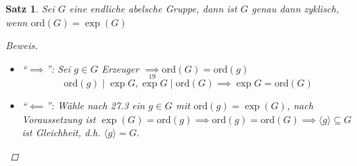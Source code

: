 \documentclass[a4paper]{article}
\theoremstyle{plain}
\newtheorem{satz}[thm]{Satz}
\theoremstyle{definition}
\begin{document}
\begin{satz}
Sei $G$ eine endliche abelsche Gruppe, dann ist $G$ genau dann zyklisch, wenn $\mathrm{ord}(G) = \exp(G)$
\begin{proof}[Beweis] \item
\begin{itemize}
\item ``$\implies$'': Sei $g \in G$ Erzeuger $\underset{19}\implies \mathrm{ord}(G) = \mathrm{ord}(g)$
$$\mathrm{ord}(g) \mid \exp G, \exp G \mid \mathrm{ord}(G) \implies \exp G = \mathrm{ord}(G)$$
\item ``$\impliedby$'': Wähle nach 27.3 ein $g \in G$ mit $\mathrm{ord}(g) = \exp(G)$, nach Voraussetzung ist $\exp(G) = \mathrm{ord}(g) \implies \mathrm{ord}(g) = \mathrm{ord}(G) \implies \langle g \rangle \subseteq G$ ist Gleichheit, d.h. $\langle g \rangle = G.$
\end{itemize}
\end{proof}
\end{satz}
\end{document}
